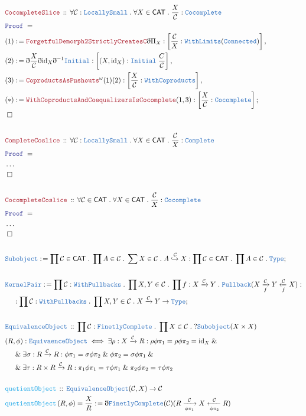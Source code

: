 \documentclass[12pt]{scrartcl}
\newcommand{\TYPE}[1]{\textcolor{NavyBlue}{\mathtt{#1}}}
\newcommand{\FUNC}[1]{\textcolor{Cerulean}{\mathtt{#1}}}
\newcommand{\LOGIC}[1]{\textcolor{Blue}{\mathtt{#1}}}
\newcommand{\THM}[1]{\textcolor{Maroon}{\mathtt{#1}}}
\renewcommand{\.}{\; . \;}
\newcommand{\de}{: \kern 0.1pc =}
\newcommand{\Act}[1]{\left( #1 \right)}
\newcommand{\Theorem}[2]{& \THM{#1} \, :: \, #2 \\ & \Proof = \\ }
\newcommand{\DeclareType}[2]{& \TYPE{#1} \, :: \, #2 \\}
\newcommand{\DefineType}[3]{& #1 : \TYPE{#2} \iff #3 \\}
\newcommand{\DeclareFunc}[2]{& \FUNC{#1} \, :: \, #2 \\}
\newcommand{\DefineNamedFunc}[4]{&  \FUNC{#1}\Act{#2} = #3 \de #4 \\}
\newcommand{\NewLine}{\\ & \kern 1pc}
\newcommand{\Page}[1]{ \begin{align*} #1 \end{align*}   }
\newcommand{ \bd }{ \ByDef }
\newcommand{\NoProof}{ & \ldots \\ \EndProof}
\renewcommand{\And}{\; \& \;}
\newcommand{\Type}{\TYPE{Type}}
\DeclareMathOperator*{\id}{id}
\newcommand{\ToMono}{\xhookrightarrow}
\newcommand{\Arrow}{\xrightarrow}
\newcommand{\Say}[3]{& #1 \de #2 : #3, \\}
\newcommand{\Conclude}[3]{& #1 \de #2 : #3; \\}
\newcommand{\QED}{\; \square}
\newcommand{\EndProof}{& \QED \\}
\newcommand{\ByDef}{\eth}
\newcommand{\Proof}{\LOGIC{Proof} \; }
\newcommand{\C}{\mathcal{C}}
\newcommand{\CAT}{\mathsf{CAT}}
\begin{document}
\Page{
	\Theorem{CocompleteSlice}{\forall \C : \TYPE{LocallySmall} \. \forall X \in \CAT \.  \frac{X}{\C} : \TYPE{Cocomplete}}
	\Say{(1)}{\THM{ForgetfulDemorph2StrictlyCreatesC} \bd \Pi_X  }
	{\left[ \frac{\C}{X} : \TYPE{WithLimits}(\TYPE{Connected}) \right]}
	\Say{(2)}{ \bd \frac{X}{\C} \bd {\id}_X \bd^{-1} \TYPE{Initial}}
	{\left[ (X,{\id}_X) : \TYPE{Initial}\;\frac{C}{\C}  \right]}
	\Say{(3)}{\THM{CoproductsAsPushouts}^\omega(1)(2)}{\left[ \frac{X}{\C} : \TYPE{WithCoproducts} \right]}
	\Conclude{(*)}{\THM{WithCoproductsAndCoequalizersIsCocomplete}(1,3)}
	{\left[ \frac{X}{\C} : \TYPE{Cocomplete} \right]}
	\EndProof
	\\
	\Theorem{CompleteCoslice}{\forall \C : \TYPE{LocallySmall} \. \forall X \in \CAT \.  \frac{\C}{X} : \TYPE{Complete}}
	\NoProof
	\\
	\Theorem{CocompleteCoslice}{\forall \C \in \CAT \. \forall X \in \CAT \.  \frac{\C}{X} : \TYPE{Cocomplete}}
	\NoProof
	\\
	\Conclude{\TYPE{Subobject}}{\prod \C \in \CAT \. \prod A \in \C \. \sum X \in \C \. A \ToMono{\C} X}
	{ \prod \C \in \CAT \. \prod A \in \C \. \Type }
	\\
	\Conclude{\TYPE{KernelPair}}{\prod \C : \TYPE{WithPullbacks} \. \prod X,Y \in \C \. \prod f : X \Arrow{\C} Y \. 
		\TYPE{Pullback}(X \Arrow[f]{\C} Y \xleftarrow[f]{\C} X)}
	{ \NewLine : \prod \C : \TYPE{WithPullbacks} \.  \prod X,Y \in \C \. X \Arrow{\C} Y \to \Type}
	\\
	\DeclareType{EquivalenceObject}{\prod \C : \TYPE{FinetlyComplete} \. \prod X \in \C \. ?\TYPE{Subobject}(X \times X) }
	\DefineType{(R,\phi)}{EquivaenceObject}{
		\exists \rho : X \Arrow{\C} R : \rho \phi \pi_1 = \rho \phi \pi_2 = {\id}_X \And \NewLine \And
		\exists \sigma : R \Arrow{\C} R : \phi \pi_1 = \sigma \phi \pi_2 \And \phi \pi_2 = \sigma \phi \pi_1
		\And \NewLine \And
		\exists \tau : R \times R \Arrow{\C} R :\pi_1\phi \pi_1 = \tau \phi \pi_1 \And \pi_2 \phi \pi_2 = \tau \phi \pi_2
	}
	\\
	\DeclareFunc{quetientObject}{\TYPE{EquivalenceObject}(\C,X) \to \C}
	\DefineNamedFunc{quetientObject}{R,\phi}{\frac{X}{R}}{\bd \TYPE{FinetlyComplete}(\C)
		(R  \Arrow[\phi\pi_1]{\C} X \xleftarrow[\phi\pi_2]{\C} R   )}
}
\end{document}
